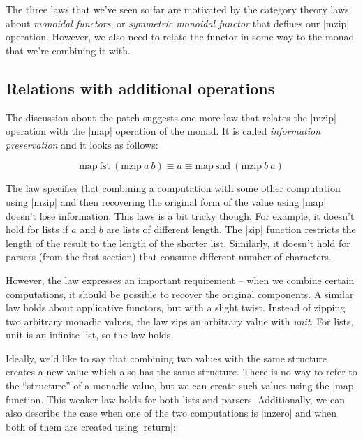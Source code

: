 \documentclass{tmr}
\begin{document}
\UndefineShortVerb{\_}
\DefineShortVerb{\|}

The three laws that we've seen so far are motivated by the category theory laws about 
\textit{monoidal functors}, or \textit{symmetric monoidal functor} that defines our |mzip| 
operation. However, we also need to relate the functor in some way to the monad that we're 
combining it with.


\subsection{Relations with additional operations}

The discussion about the patch \cite{bringbackmc} suggests one more law that relates the |mzip|
operation with the |map| operation of the monad. It is called \textit{information preservation}
and it looks as follows:

\begin{equation}
  \text{map} \: \text{fst} \: (\text{mzip} \: a \: b) \equiv a \equiv \text{map} \: \text{snd} \: (\text{mzip} \: b \: a)
  \label{law:ipreserve}
\end{equation}

The law specifies that combining a computation with some other computation using |mzip| and then 
recovering the original form of the value using |map| doesn't lose information. This laws is a bit 
tricky though. For example, it doesn't hold for lists if $a$ and $b$ are lists of different length. 
The |zip| function restricts the length of the result to the length of the shorter list. Similarly, it 
doesn't hold for parsers (from the first section) that consume different number of characters. 

However, the law expresses an important requirement -- when we combine certain computations, it should be
possible to recover the original components. A similar law holds about applicative functors, but with 
a slight twist. Instead of zipping two arbitrary monadic values, the law zips an arbitrary value with
\textit{unit}. For lists, unit is an infinite list, so the law holds.

Ideally, we'd like to say that combining two values with the same structure creates a new value
which also has the same structure. There is no way to refer to the ``structure'' of a monadic value, 
but we can create such values using the |map| function. This weaker law holds for both lists and 
parsers. Additionally, we can also describe the case when one of the two computations is |mzero| and
when both of them are created using |return|:
\end{document}
